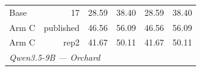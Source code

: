 \begin{table}[t]
{\begin{tabular}{lrrrrr}
Base & 17 & 28.59 & 38.40 & 28.59 & 38.40 \\
Arm C & published & 46.56 & 56.09 & 46.56 & 56.09 \\
Arm C & rep2 & 41.67 & 50.11 & 41.67 & 50.11 \\
\midrule
\multicolumn{6}{l}{\textit{Qwen3.5-9B --- Orchard}} \\

\end{tabular}}
\end{table}
